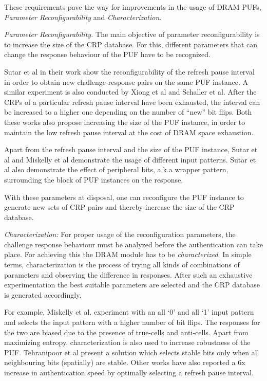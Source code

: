 \documentclass[journal, a4paper]{IEEEtran}
\begin{document}
These requirements pave the way for improvements in the usage of DRAM PUFs, \textit{Parameter Reconfigurability} and \textit{Characterization}.

\textit{Parameter Reconfigurability.} The main objective of parameter reconfigurability is to increase the size of the CRP database. For this, different parameters that can change the response behaviour of the PUF have to be recognized.

Sutar et al in their work show the reconfigurability of the refresh pause interval in order to obtain new challenge-response pairs on the same PUF instance. A similar experiment is also conducted by Xiong et al and Schaller et al. After the CRPs of a particular refresh pause interval have been exhausted, the interval can be increased to a higher one depending on the number of “new” bit flips. Both these works also propose increasing the size of the PUF instance, in order to maintain the low refresh pause interval at the cost of DRAM space exhaustion. 

Apart from the refresh pause interval and the size of the PUF instance, Sutar et al and Miskelly et al demonstrate the usage of different input patterns. Sutar et al also demonstrate the effect of peripheral bits, a.k.a wrapper pattern, surrounding the block of PUF instances on the response.

With these parameters at disposal, one can reconfigure the PUF instance to generate new sets of CRP pairs and thereby increase the size of the CRP database.

\textit{Characterization:} For proper usage of the reconfiguration parameters, the challenge response behaviour must be analyzed before the authentication can take place. For achieving this the DRAM module has to be \textit{characterized}. In simple terms, characterization is the process of trying all kinds of combinations of parameters and observing the difference in responses.\cite{SUT18} After such an exhaustive experimentation the best suitable parameters are selected and the CRP database is generated accordingly. 

For example, Miskelly et al. experiment with an all ‘0’ and all ‘1’ input pattern and selects the input pattern with a higher number of bit flips. The responses for the two are biased due to the presence of true-cells and anti-cells. Apart from maximizing entropy, characterization is also used to increase robustness of the PUF. Tehranipoor et al present a solution which selects stable bits only when all neighbouring bits (spatially) are stable. Other works have also reported a 6x increase in authentication speed by optimally selecting a refresh pause interval. \cite{SUT18} \cite{SCH19}
\end{document}
